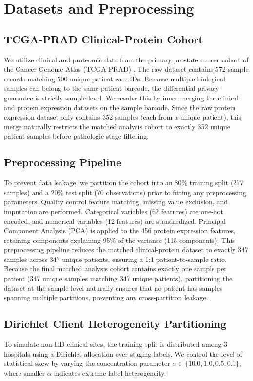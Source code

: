 \documentclass[conference]{IEEEtran}
\begin{document}
\begin{itemize}
\end{itemize}

\section{Datasets and Preprocessing}

\subsection{TCGA-PRAD Clinical-Protein Cohort}
We utilize clinical and proteomic data from the primary prostate cancer cohort of the Cancer Genome Atlas (TCGA-PRAD) \cite{TCGA2015PRAD}. The raw dataset contains 572 sample records matching 500 unique patient case IDs. Because multiple biological samples can belong to the same patient barcode, the differential privacy guarantee is strictly sample-level. We resolve this by inner-merging the clinical and protein expression datasets on the sample barcode. Since the raw protein expression dataset only contains 352 samples (each from a unique patient), this merge naturally restricts the matched analysis cohort to exactly 352 unique patient samples before pathologic stage filtering.

\subsection{Preprocessing Pipeline}
To prevent data leakage, we partition the cohort into an 80\% training split (277 samples) and a 20\% test split (70 observations) prior to fitting any preprocessing parameters. Quality control feature matching, missing value exclusion, and imputation are performed. Categorical variables (62 features) are one-hot encoded, and numerical variables (12 features) are standardized. Principal Component Analysis (PCA) is applied to the 456 protein expression features, retaining components explaining 95\% of the variance (115 components). This preprocessing pipeline reduces the matched clinical-protein dataset to exactly 347 samples across 347 unique patients, ensuring a 1:1 patient-to-sample ratio. Because the final matched analysis cohort contains exactly one sample per patient (347 unique samples matching 347 unique patients), partitioning the dataset at the sample level naturally ensures that no patient has samples spanning multiple partitions, preventing any cross-partition leakage.

\subsection{Dirichlet Client Heterogeneity Partitioning}
To simulate non-IID clinical sites, the training split is distributed among 3 hospitals using a Dirichlet allocation over staging labels. We control the level of statistical skew by varying the concentration parameter $\alpha \in \{10.0, 1.0, 0.5, 0.1\}$, where smaller $\alpha$ indicates extreme label heterogeneity.
\end{document}
